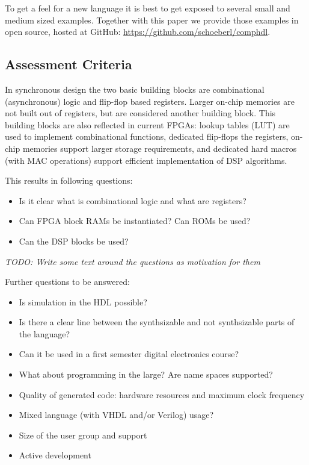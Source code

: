 \documentclass[a4paper, conference]{IEEEtran}
\newcommand{\todo}[1]{{\emph{TODO: #1}}}
\begin{document}
To get a feel for a new language it is best to get exposed to several
small and medium sized examples. Together with this paper we provide
those examples in open source, hosted at GitHub:
\url{https://github.com/schoeberl/comphdl}.

\subsection{Assessment Criteria}


In synchronous design the two basic building blocks are combinational
(asynchronous) logic and flip-flop based registers. Larger on-chip
memories are not built out of registers, but are considered another building
block. This building blocks are also reflected in current FPGAs: lookup tables
(LUT) are used to implement combinational functions, dedicated flip-flops
the registers, on-chip memories support larger storage requirements,
and dedicated hard macros (with MAC operations) support efficient
implementation of DSP algorithms.

This results in following questions:
\begin{itemize}
\item Is it clear what is combinational logic and what are registers?
\item Can FPGA block RAMs be instantiated? Can ROMs be used?
\item Can the DSP blocks be used?
\end{itemize}

\todo{Write some text around the questions as motivation for them}

Further questions to be answered:

\begin{itemize}
\item Is simulation in the HDL possible?
\item Is there a clear line between the synthsizable  and not synthsizable parts of the language?
\item Can it be used in a first semester digital electronics course?
\item What about programming in the large? Are name spaces supported?
\item Quality of generated code: hardware resources and maximum clock frequency
\item Mixed language (with VHDL and/or Verilog) usage?
\item Size of the user group and support
\item Active development
\end{itemize}
\end{document}
